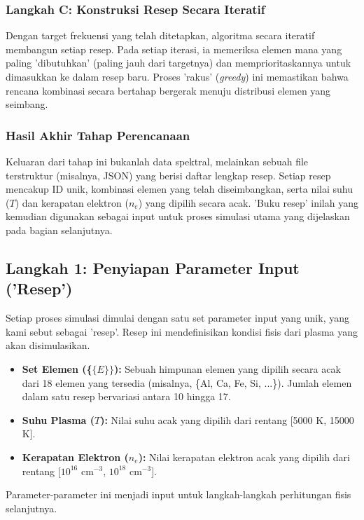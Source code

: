 \subsubsection*{Langkah C: Konstruksi Resep Secara Iteratif}
Dengan target frekuensi yang telah ditetapkan, algoritma secara iteratif membangun setiap resep. Pada setiap iterasi, ia memeriksa elemen mana yang paling 'dibutuhkan' (paling jauh dari targetnya) dan memprioritaskannya untuk dimasukkan ke dalam resep baru. Proses 'rakus' (\textit{greedy}) ini memastikan bahwa rencana kombinasi secara bertahap bergerak menuju distribusi elemen yang seimbang.

\subsubsection*{Hasil Akhir Tahap Perencanaan}
Keluaran dari tahap ini bukanlah data spektral, melainkan sebuah file terstruktur (misalnya, JSON) yang berisi daftar lengkap resep. Setiap resep mencakup ID unik, kombinasi elemen yang telah diseimbangkan, serta nilai suhu ($T$) dan kerapatan elektron ($n_e$) yang dipilih secara acak. 'Buku resep' inilah yang kemudian digunakan sebagai input untuk proses simulasi utama yang dijelaskan pada bagian selanjutnya.

\subsection{Langkah 1: Penyiapan Parameter Input ('Resep')}
Setiap proses simulasi dimulai dengan satu set parameter input yang unik, yang kami sebut sebagai 'resep'. Resep ini mendefinisikan kondisi fisis dari plasma yang akan disimulasikan.
\begin{itemize}
    \item \textbf{Set Elemen (\{$\{E\}\}$):} Sebuah himpunan elemen yang dipilih secara acak dari 18 elemen yang tersedia (misalnya, \{Al, Ca, Fe, Si, ...\}). Jumlah elemen dalam satu resep bervariasi antara 10 hingga 17.
    \item \textbf{Suhu Plasma ($T$):} Nilai suhu acak yang dipilih dari rentang [5000 K, 15000 K].
    \item \textbf{Kerapatan Elektron ($n_e$):} Nilai kerapatan elektron acak yang dipilih dari rentang [$10^{16}$ cm$^{-3}$, $10^{18}$ cm$^{-3}$].
\end{itemize}
Parameter-parameter ini menjadi input untuk langkah-langkah perhitungan fisis selanjutnya.

